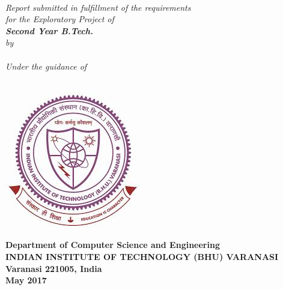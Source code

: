 \begin{titlepage}
\thispagestyle{empty}
\mbox{}
\begin{center}
\textheight 15.5in \textwidth 12.5in {\LARGE\bf  \the\phdtitle}\\[9ex]
\emph{Report submitted in fulfillment of the requirements\\
for the Exploratory Project of\\
[2ex]\large \bf Second Year B.Tech.
}\\
[2ex] \emph{by} \\[2ex]
{\large\sf \bf \the\name}\\ [7ex] 
\emph{Under the guidance of}\\[1ex]
{\large \sf \bf \the\guide} \\[7ex]

\vspace{.05in}
\begin{center}
 \includegraphics[scale=.7,keepaspectratio=true]{./pictures/logo.jpeg}
\end{center}
% 

\vspace{1cm}
{\small  \bf Department of Computer Science and Engineering}  \\[1ex]
{\small \bf{INDIAN INSTITUTE OF TECHNOLOGY (BHU) VARANASI \\
Varanasi 221005, India\\
  May 2017}}

\end{center}
\end{titlepage}
